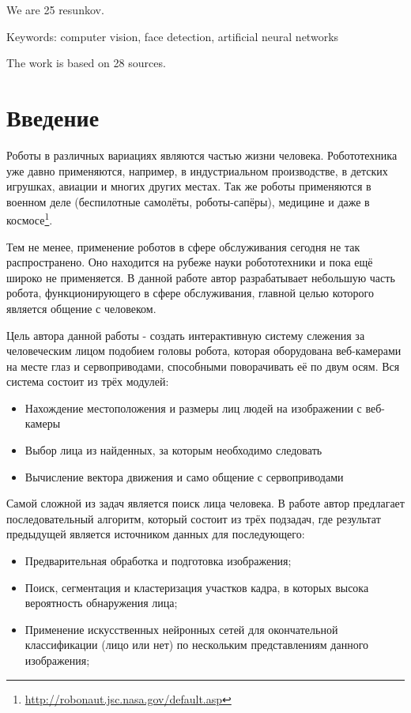\documentclass[12pt]{report}
\newenvironment{myItemize}{
 	\vspace{-10pt}
	\begin{itemize}[nolistsep]
}{\end{itemize}}
\begin{document}
We are 25 resunkov.

Keywords: computer vision, face detection, artificial neural networks

The work is based on 28 sources.



\chapter*{Введение}
\thispagestyle{fancy}

Роботы в различных вариациях являются частью жизни человека. Робототехника уже
давно применяются, например, в индустриальном производстве, в детских игрушках,
авиации и многих других местах. Так же роботы применяются в военном деле (беспилотные
самолёты, роботы-сапёры), медицине и даже в космосе\footnote{\url{http://robonaut.jsc.nasa.gov/default.asp}}.

Тем не менее, применение роботов в сфере обслуживания сегодня не так распространено. Оно находится на рубеже науки 
робототехники и пока ещё широко не применяется. В данной работе автор разрабатывает небольшую
часть робота, функционирующего в сфере обслуживания, главной целью которого
является общение с человеком. 

Цель автора данной работы - создать интерактивную систему слежения за человеческим лицом подобием головы робота, 
которая оборудована веб-камерами на месте глаз и сервоприводами, способными поворачивать её по двум осям. Вся 
система состоит из трёх модулей:
\begin{myItemize}
\item Нахождение местоположения и размеры лиц людей на изображении с веб-камеры
\item Выбор лица из найденных, за которым необходимо следовать
\item Вычисление вектора движения и само общение с сервоприводами
\end{myItemize}

Самой сложной из задач является поиск лица человека. В работе автор предлагает последовательный алгоритм, 
который состоит из трёх подзадач, где результат предыдущей является источником данных для последующего:
\begin{myItemize}
\item Предварительная обработка и подготовка изображения;
\item Поиск, сегментация и кластеризация участков кадра, в которых высока вероятность обнаружения лица;
\item Применение искусственных нейронных сетей для окончательной классификации (лицо или нет) по нескольким 
представлениям данного изображения;
\end{myItemize}
\end{document}
